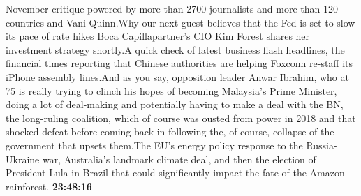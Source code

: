 \documentclass{article}%
\begin{document}
November critique powered by more than 2700 journalists and more than 120 countries and Vani Quinn.Why our next guest believes that the Fed is set to slow its pace of rate hikes Boca Capillapartner's CIO Kim Forest shares her investment strategy shortly.A quick check of latest business flash headlines, the financial times reporting that Chinese authorities are helping Foxconn re{-}staff its iPhone assembly lines.And as you say, opposition leader Anwar Ibrahim, who at 75 is really trying to clinch his hopes of becoming Malaysia's Prime Minister, doing a lot of deal{-}making and potentially having to make a deal with the BN, the long{-}ruling coalition, which of course was ousted from power in 2018 and that shocked defeat before coming back in following the, of course, collapse of the government that upsets them.The EU's energy policy response to the Russia{-}Ukraine war, Australia's landmark climate deal, and then the election of President Lula in Brazil that could significantly impact the fate of the Amazon rainforest.%
\textbf{23:48:16}%
\newline%
\end{document}
